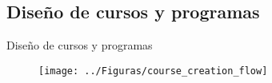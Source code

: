 \documentclass[10pt,xcolor=table ]{beamer}
\begin{document}
\maketitle

\subsection{Diseño de cursos y programas}
\begin{frame}{Diseño de cursos y programas}
	\begin{figure}
		\centering
	    \texttt{[image: ../Figuras/course\_creation\_flow]}
	\end{figure}
\end{frame}
\end{document}

